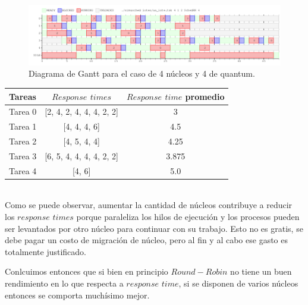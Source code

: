 \begin{figure}[H]
	\includegraphics[scale=0.49]{ej7/ej7_4_4.png}
	\caption{Diagrama de Gantt para el caso de 4 núcleos y 4 de quantum.}
\end{figure}

\begin{center}
  \begin{tabular}{ |l | c | c | }
    \hline
    Tareas    & $Response$ $times$ & $Response$ $time$ promedio  \\ \hline
    Tarea 0 & [2, 4, 2, 4, 4, 4, 2, 2] & 3 \\ \hline
    Tarea 1 & [4, 4, 4, 6]    & 4.5       \\ \hline
    Tarea 2 & [4, 5, 4, 4]   & 4.25        \\ \hline
    Tarea 3 & [6, 5, 4, 4, 4, 4, 2, 2]  & 3.875          \\ \hline
    Tarea 4 & [4, 6]   & 5.0          \\ \hline
  \end{tabular} \\ \vspace{10pt} 
	Como se puede observar, aumentar la cantidad de núcleos contribuye a reducir los $response$ $times$ porque paraleliza los hilos de ejecución y los procesos pueden ser levantados por otro núcleo para continuar con su trabajo. Esto no es gratis, se debe pagar un costo de migración de núcleo, pero al fin y al cabo ese gasto es totalmente justificado.
\end{center}

Conlcuimos entonces que si bien en principio $Round-Robin$ no tiene un buen rendimiento en lo que respecta a $response$ $time$, si se disponen de varios núcleos entonces se comporta muchísimo mejor.